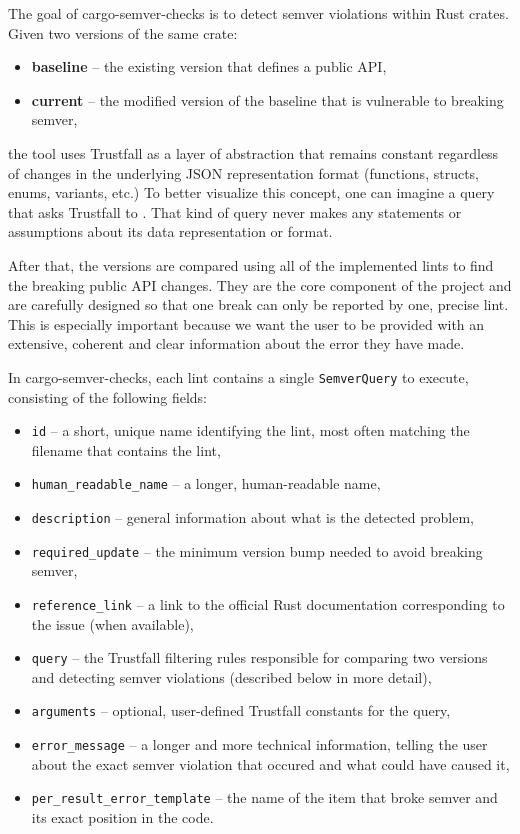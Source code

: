 \documentclass[licencjacka,en]{pracamgr}
\begin{document}
The goal of cargo-semver-checks is to detect semver violations within Rust crates. Given two
versions of the same crate:
\begin{itemize}
	\item \textbf{baseline} -- the existing version that defines a public API,
	\item \textbf{current} -- the modified version of the baseline that is vulnerable to
		breaking semver,
\end{itemize}
the tool uses Trustfall as a layer of abstraction that remains constant regardless of changes in
the underlying JSON representation format (functions, structs, enums, variants, etc.) To better
visualize this concept, one can imagine a query that asks Trustfall to . That kind
of query never makes any statements or assumptions about its data representation or format.

After that, the versions are compared using all of the implemented lints to find the breaking
public API changes. They are the core component of the project and are carefully designed so that
one break can only be reported by one, precise lint. This is especially important because we want
the user to be provided with an extensive, coherent and clear information about the error they
have made.

In cargo-semver-checks, each lint contains a single \texttt{SemverQuery} to execute, consisting of
the following fields:

\begin{itemize}
	\item \texttt{id} -- a short, unique name identifying the lint, most often matching the
		filename that contains the lint,
	\item \texttt{human\_readable\_name} -- a longer, human-readable name,
	\item \texttt{description} -- general information about what is the detected problem,
	\item \texttt{required\_update} -- the minimum version bump needed to avoid breaking semver,
	\item \texttt{reference\_link} -- a link to the official Rust documentation corresponding to
		the issue (when available),
	\item \texttt{query} -- the Trustfall filtering rules responsible for comparing two versions and
		detecting semver violations (described below in more detail),
	\item \texttt{arguments} -- optional, user-defined Trustfall constants for the query,
	\item \texttt{error\_message} -- a longer and more technical information, telling the user
	    about the exact semver violation that occured and what could have caused it,
	\item \texttt{per\_result\_error\_template} -- the name of the item that broke semver and
	    its exact position in the code.
\end{itemize}
\end{document}
